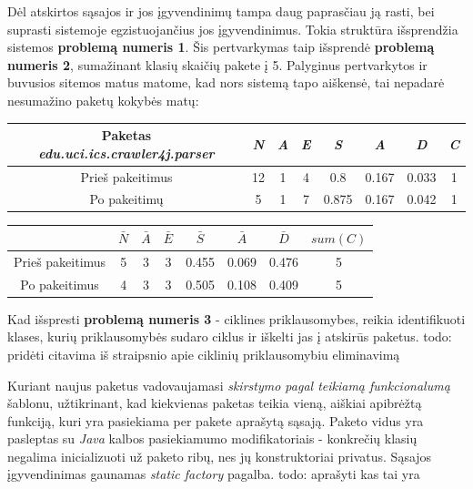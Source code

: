 Dėl atskirtos sąsajos ir jos įgyvendinimų tampa daug paprasčiau ją rasti, bei suprasti sistemoje egzistuojančius jos įgyvendinimus.
Tokia struktūra išsprendžia sistemos \textbf{problemą numeris 1}.
Šis pertvarkymas taip išsprendė \textbf{problemą numeris 2}, sumažinant klasių skaičių pakete į 5.
Palyginus pertvarkytos ir buvusios sitemos matus matome, kad nors sistemą tapo aiškensė, tai nepadarė nesumažino paketų kokybės matų:
\begin{center}
    \begin{tabular}{|c|c|c|c|c|c|c|c|}
        \hline
        Paketas \textit{edu.uci.ics.crawler4j.parser} & \textit{N} & \textit{A} & \textit{E} & \textit{S} & \textit{A} & \textit{D} & \textit{C} \\ [0.5ex]
        \hline\hline
        Prieš pakeitimus & 12 & 1 & 4 & 0.8 & 0.167 & 0.033 & 1 \\
        \hline
        Po pakeitimų & 5 & 1 & 7 & 0.875 & 0.167 & 0.042 & 1 \\
        \hline
    \end{tabular}
    \begin{tabular}{|c|c|c|c|c|c|c|c|}
        \hline
        & $\bar{N}$ & $\bar{A}$ & $\bar{E}$ & $\bar{S}$ & $\bar{A}$ & $\bar{D}$ & $sum(C)$\\ [0.5ex]
        \hline\hline
        Prieš pakeitimus & 5 & 3 & 3 & 0.455 & 0.069 & 0.476 & 5\\
        \hline
        Po pakeitimus & 4 & 3 & 3 & 0.505 & 0.108 & 0.409 & 5 \\
        \hline
    \end{tabular}
\end{center}
Kad išspresti \textbf{problemą numeris 3} - ciklines priklausomybes, reikia identifikuoti klases, kurių priklausomybės
sudaro ciklus ir iškelti jas į atskirūs paketus.
todo: pridėti citavima iš straipsnio apie ciklinių priklausomybiu eliminavimą

Kuriant naujus paketus vadovaujamasi \textit{skirstymo pagal teikiamą funkcionalumą} šablonu, užtikrinant, kad kiekvienas
paketas teikia vieną, aiškiai apibrėžtą funkciją, kuri yra pasiekiama per pakete aprašytą sąsają.
Paketo vidus yra pasleptas su \textit{Java} kalbos pasiekiamumo modifikatoriais - konkrečių klasių negalima inicializuoti už paketo ribų,
nes jų konstruktoriai privatus.
Sąsajos įgyvendinimas gaunamas \textit{static factory} pagalba.
todo: aprašyti kas tai yra

